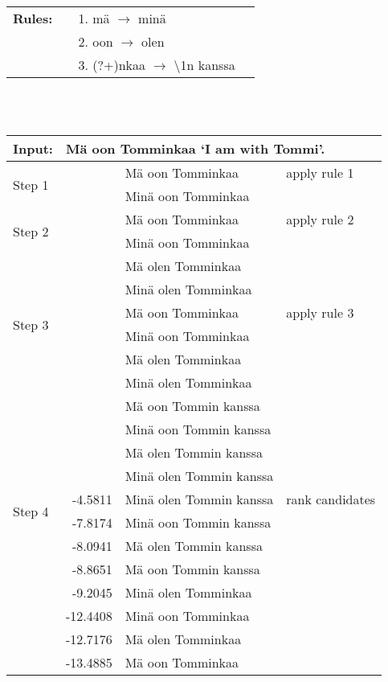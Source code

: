 \documentclass[11pt]{article}
\begin{document}
\begin{table*}
  \centering
  \begin{tabular}{|lrl|l|}
    \hline
    \textbf{Rules:} & & 1. m\"{a} $\rightarrow$ min\"{a} \\
     ~              & & 2. oon $\rightarrow$ olen \\
     ~              & & 3. (?+)nkaa $\rightarrow$ \textbackslash1n kanssa \\
    \hline
  \end{tabular}
~\\
~\\
  \begin{tabular}{|l|r|l|l|}
    \hline
    \textbf{Input:} & \multicolumn{3}{l|}{M\"{a} oon Tomminkaa `I am with Tommi'.} \\
    \hline
    \multirow{2}{*}{Step 1} & & M\"{a} oon Tomminkaa & apply rule 1 \\
                            & & Min\"{a} oon Tomminkaa & \\
    \hline
    \multirow{2}{*}{Step 2} & & M\"{a} oon Tomminkaa & apply rule 2 \\
                            &   & Min\"{a} oon Tomminkaa & \\
                            &   & M\"{a} olen Tomminkaa & \\
                            &   & Min\"{a} olen Tomminkaa & \\
    \hline
    \multirow{2}{*}{Step 3} &   & M\"{a} oon Tomminkaa   & apply rule 3\\
                            &   & Min\"{a} oon Tomminkaa  &\\
                            &   & M\"{a} olen Tomminkaa  &\\
                            &   & Min\"{a} olen Tomminkaa  &\\
                            &   & M\"{a} oon Tommin kanssa  &\\
                            &   & Min\"{a} oon Tommin kanssa  &\\
                            &   & M\"{a} olen Tommin kanssa  &\\
                            &   & Min\"{a} olen Tommin kanssa  &\\
    \hline
    \multirow{2}{*}{Step 4} & -4.5811 &  Min\"{a} olen Tommin kanssa & rank candidates \\
                            & -7.8174 &  Min\"{a} oon Tommin kanssa & \\
                            & -8.0941 &  M\"{a} olen Tommin kanssa & \\
                            & -8.8651&  M\"{a} oon Tommin kanssa & \\
                            & -9.2045 &  Min\"{a} olen Tomminkaa & \\
                            & -12.4408 &  Min\"{a} oon Tomminkaa & \\
                            & -12.7176 &  M\"{a} olen Tomminkaa & \\
                            & -13.4885 &  M\"{a} oon Tomminkaa & \\


\end{tabular}
\end{table*}
\end{document}
